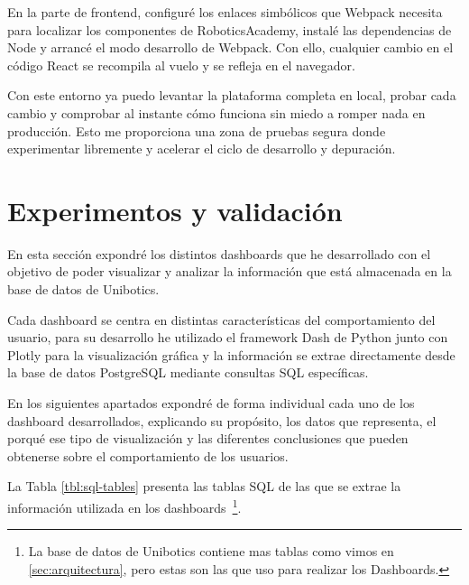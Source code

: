\documentclass[a4paper, 12pt]{book}
\begin{document}
En la parte de frontend, configuré los enlaces simbólicos que Webpack necesita para localizar los componentes de RoboticsAcademy, instalé las dependencias de Node y arrancé el modo desarrollo de Webpack. Con ello, cualquier cambio en el código React se recompila al vuelo y se refleja en el navegador.

Con este entorno ya puedo levantar la plataforma completa en local, probar cada cambio y comprobar al instante cómo funciona sin miedo a romper nada en producción. Esto me proporciona una zona de pruebas segura donde experimentar libremente y acelerar el ciclo de desarrollo y depuración.


\cleardoublepage



\chapter{Experimentos y validación}
\label{chap:experimentos}

En esta sección expondré los distintos dashboards que he desarrollado con el objetivo de poder visualizar y analizar la información que está almacenada en la base de datos de Unibotics.

Cada dashboard se centra en distintas características del comportamiento del usuario, para su desarrollo he utilizado el framework Dash de Python junto con Plotly para la visualización gráfica y la información se extrae directamente desde la base de datos PostgreSQL mediante consultas SQL específicas.

En los siguientes apartados expondré de forma individual cada uno de los dashboard desarrollados, explicando su propósito, los datos que representa, el porqué ese tipo de visualización y las diferentes conclusiones que pueden obtenerse sobre el comportamiento de los usuarios.

La Tabla \ref{tbl:sql-tables} presenta las tablas SQL de las que se extrae la información utilizada en los dashboards~\footnote{La base de datos de Unibotics contiene mas tablas como vimos en \ref{sec:arquitectura}, pero estas son las que uso para realizar los Dashboards.}.
\end{document}

